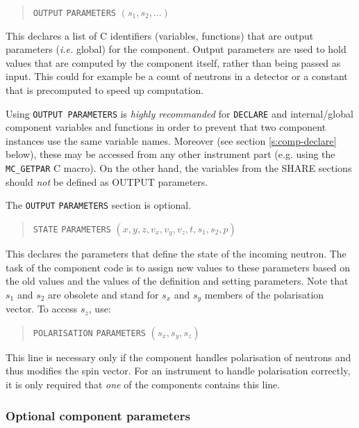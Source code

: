 \begin{quote}
  \texttt{OUTPUT} \texttt{PARAMETERS} $(s_1, s_2, \ldots)$
\end{quote}
This declares a list of C identifiers (variables, functions) that are
output parameters ({\it i.e.} global) for the
component. Output parameters are used to hold values that are computed
by the component itself, rather than being passed as input. This could
for example be a count of neutrons in a detector or a constant that is
precomputed to speed up computation.

Using \texttt{OUTPUT PARAMETERS} is \emph{highly recommanded} for \texttt{DECLARE} and internal/global component variables and functions in order to prevent that two component instances use the same variable names. Moreover (see section \ref{s:comp-declare} below), these may be accessed from any other instrument part (e.g. using the \verb+MC_GETPAR+ C macro).
On the other hand, the variables from the SHARE sections should \emph{not}
be defined as OUTPUT parameters.

The \texttt{OUTPUT} \texttt{PARAMETERS} section is optional.

\begin{quote}
  \texttt{STATE} \texttt{PARAMETERS} $(x,y,z,v_x,v_y,v_z,t,s_1,s_2,p)$
\end{quote}
This declares the parameters that define the state of the incoming
neutron. The task of the component code is to assign new values to these
parameters based on the old values and the values of the definition and
setting parameters. Note that $s_1$ and $s_2$ are obsolete and stand for
$s_x$ and $s_y$ members of the polarisation vector. To access $s_z$, use:
\begin{quote}
  \texttt{POLARISATION} \texttt{PARAMETERS} $(s_x,s_y,s_z)$
\end{quote}
This line is necessary only if the component handles polarisation of neutrons
and thus modifies the spin vector. For an instrument to handle polarisation
correctly, it is only required that {\em one} of the components contains this
line.

\subsubsection{Optional component parameters}

